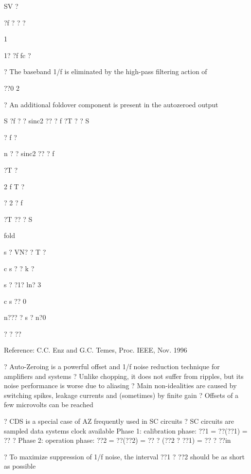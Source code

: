 \documentclass[2pt,landscape]{article}
\begin{document}
\begin{multicols*}{5}
SV ?


?f ? ?	?


1


1? ?f fc ?











?	The baseband 1/f is eliminated by the high-pass filtering action of


??0	2


?	An additional foldover component is present in the autozeroed output




S	?f ? ? sinc2 ?? ? f ?T ? ?	S


? f ?


n ? ? sinc2 ?? ? f




?T ?


2 f	T	?


? 2 ? f




?T ?? ? S


fold


s	?  VN?  ?	T  ?


c	s ?	? k ?


s ? ?1? 
ln? 3


c	s 
??	0


n???	?	s ?
n?0


?	?
??




Reference: C.C. Enz and G.C. Temes, Proc. IEEE, Nov. 1996



?	Auto-Zeroing is a powerful offset and 1/f noise reduction technique for 
amplifiers and systems
?	Unlike chopping, it does not suffer from ripples, but its noise 
performance is worse due to aliasing
?	Main non-idealities are caused by switching spikes, leakage currents 
and (sometimes) by finite gain
?	Offsets of a few microvolts can be reached






?	CDS is a special case of AZ frequently used in SC circuits
?	SC circuits are sampled data systems	clock available
\textbullet 	Phase 1: calibration phase: ??1 = ??(??1) = ?? ?
\textbullet 	Phase 2: operation phase: ??2 = ??(??2) = ?? ?
(??2 ? ??1) = ?? ? ??in

?	To maximize suppression of 1/f noise, the interval ??1 ? ??2 should be as 
short as possible






\end{multicols*}
\end{document}
